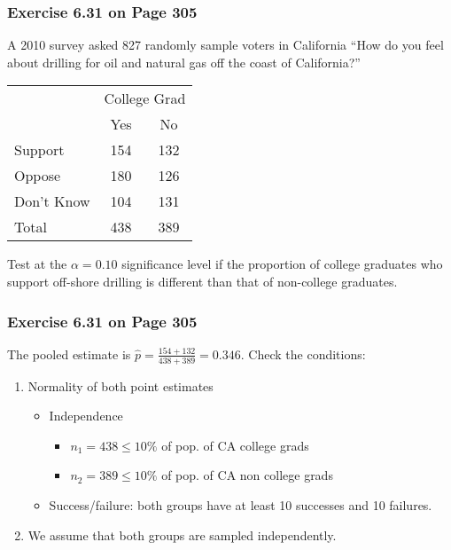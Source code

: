 \documentclass[handout]{beamer}
\newcommand{\blue}[1]{\textcolor{blue2}{#1}}
\begin{document}
\begin{frame}[fragile]
\frametitle{Exercise 6.31 on Page 305}
A 2010 survey asked 827 randomly sample voters in California ``How do you feel about drilling for oil and natural gas off the coast of California?''

\begin{center}
\begin{tabular}{l|cc}
 & \multicolumn{2}{c}{College Grad} \\
 & Yes & No  \\
\hline
Support & 154 & 132  \\
Oppose & 180 & 126 \\
Don't Know & 104 & 131 \\
\hline
Total & 438 & 389 \\
\end{tabular}
\end{center}

\pause Test at the $\alpha = 0.10$ significance level if the proportion of college graduates who support off-shore drilling is different than that of non-college graduates.
\end{frame}


\begin{frame}[fragile]
\frametitle{Exercise 6.31 on Page 305}

%
%
The pooled estimate is $\widehat{p} = \frac{154+132}{438+389}=0.346$.  Check the conditions:\\

\begin{enumerate}
\pause \item Normality of both point estimates
\begin{itemize}
\pause \item Independence
\begin{itemize}
\item $n_1 = 438 \leq 10\%$ of pop. of CA \blue{college grads}
\item $n_2 = 389 \leq 10\%$ of pop. of CA \blue{non college grads}
\end{itemize}
\pause \item Success/failure: both groups have at least 10 successes and 10 failures.
\end{itemize}
\pause \item We assume that both groups are sampled independently.  
\end{enumerate}

\end{frame}
\end{document}
